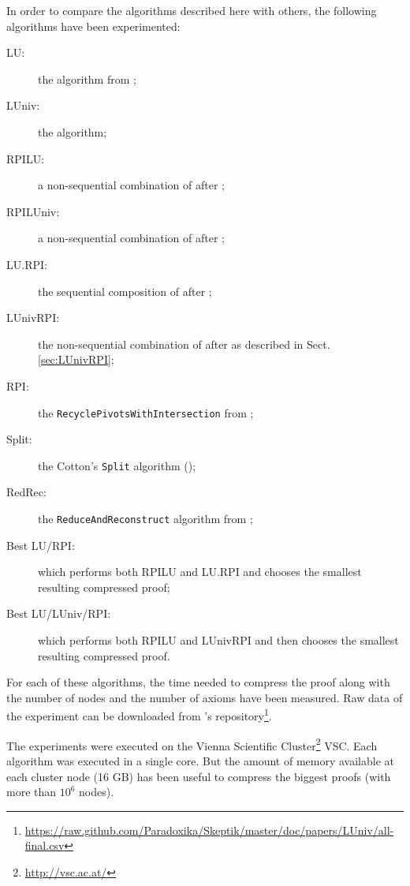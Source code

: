 \documentclass{llncs}
\begin{document}
In order to compare the algorithms described here with others, the following algorithms have been experimented:
\begin{description}
  \item[LU:] the {\LowerUnits} algorithm from \cite{LURPI};
  \item[LUniv:] the {\LowerUnivalents} algorithm;
  \item[RPILU:] a non-sequential combination of {\RPI} after {\LowerUnits};
  \item[RPILUniv:] a non-sequential combination of {\RPI} after {\LowerUnivalents};
  \item[LU.RPI:] the sequential composition of {\LowerUnits} after {\RPI};
  \item[LUnivRPI:] the non-sequential combination of {\LowerUnivalents} after {\RPI} as described in Sect. \ref{sec:LUnivRPI};
  \item[RPI:] the \texttt{RecyclePivotsWithIntersection} from \cite{LURPI};
  \item[Split:] the Cotton's \texttt{Split} algorithm (\cite{CottonSplit});
  \item[RedRec:] the \texttt{ReduceAndReconstruct} algorithm from \cite{RedRec};
  \item[Best LU/RPI:] which performs both RPILU and LU.RPI and chooses the smallest resulting compressed proof;
  \item[Best LU/LUniv/RPI:] which performs both RPILU and LUnivRPI and then chooses the smallest resulting
    compressed proof.
\end{description}

For each of these algorithms, the time needed to compress the proof along with the number of nodes
and the number of axioms have been measured. Raw data of the experiment can be downloaded from {\skeptik}'s repository\footnote{\url{https://raw.github.com/Paradoxika/Skeptik/master/doc/papers/LUniv/all-final.csv}}.

The experiments were executed on the Vienna Scientific Cluster\footnote{\url{http://vsc.ac.at/}}
VSC. Each algorithm was executed in a single core. But the amount of memory available
at each cluster node (16 GB) has been useful to compress the biggest proofs (with more than $10^6$ nodes).
\end{document}
